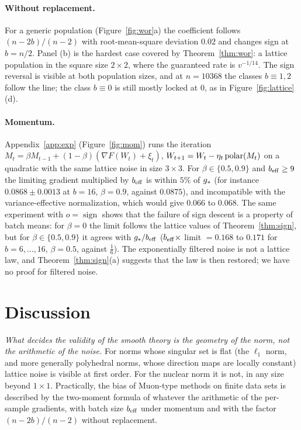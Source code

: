 \documentclass[anon,12pt]{colt2026}
\begin{document}
\paragraph{Without replacement.} For a generic population (Figure~\ref{fig:wor}a) the coefficient follows
$(n-2b)/(n-2)$ with root-mean-square deviation $0.02$ and changes sign at $b=n/2$. Panel (b) is the hardest case
covered by Theorem~\ref{thm:wor}: a lattice population in the square size $2\times2$, where the guaranteed rate is
$v^{-1/14}$. The sign reversal is visible at both population sizes, and at $n=10368$ the classes $b\equiv1,2$ follow
the line; the class $b\equiv0$ is still mostly locked at $0$, as in Figure~\ref{fig:lattice}(d).

\paragraph{Momentum.} Appendix~\ref{app:exp} (Figure~\ref{fig:mom}) runs the iteration
$M_t=\beta M_{t-1}+(1-\beta)(\nabla F(W_t)+\xi_t)$, $W_{t+1}=W_t-\eta_t\operatorname{polar}(M_t)$ on a quadratic with the same lattice
noise in size $3\times3$. For $\beta\in\{0.5,0.9\}$ and $b_{\mathrm{eff}}\ge9$ the limiting gradient multiplied by $b_{\mathrm{eff}}$ is within
$5\%$ of $g_\ast$ (for instance $0.0868\pm0.0013$ at $b=16$, $\beta=0.9$, against $0.0875$), and incompatible with the
variance-effective normalization, which would give $0.066$ to $0.068$. The same experiment with $o=\operatorname{sign}$ shows
that the failure of sign descent is a property of batch means: for $\beta=0$ the limit follows the lattice values of
Theorem~\ref{thm:sign}, but for $\beta\in\{0.5,0.9\}$ it agrees with $g_\ast/b_{\mathrm{eff}}$ ($b_{\mathrm{eff}}\times$ limit $=0.168$ to $0.171$
for $b=6,\dots,16$, $\beta=0.5$, against $\frac16$). The exponentially filtered noise is not a lattice law, and
Theorem~\ref{thm:sign}(a) suggests that the law is then restored; we have no proof for filtered noise.

\section{Discussion}\label{sec:disc}

\emph{What decides the validity of the smooth theory is the geometry of the norm, not the arithmetic of the noise.}
For norms whose singular set is flat (the $\ell_1$ norm, and more generally polyhedral norms, whose direction maps
are locally constant) lattice noise is visible at first order. For the nuclear norm it is not, in any size beyond
$1\times1$. Practically, the bias of Muon-type methods on finite data sets is described by the two-moment formula of
\citet{companionI} whatever the arithmetic of the per-sample gradients, with batch size $b_{\mathrm{eff}}$ under momentum and with
the factor $(n-2b)/(n-2)$ without replacement.
\end{document}
